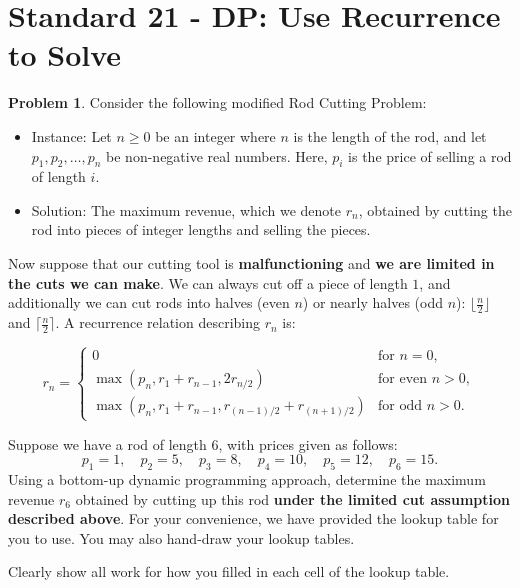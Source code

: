 \documentclass[11pt]{article}
\theoremstyle{definition}
\theoremstyle{definition}
\newtheorem{required}{Problem}
\theoremstyle{definition}
\begin{document}
\newpage
\section{Standard 21 - DP: Use Recurrence to Solve}

\begin{required} \label{Problem2}
Consider the following modified \textsf{Rod Cutting Problem}:  
\begin{itemize}
\item \textsf{Instance:} Let $n \geq 0$ be an integer where $n$ is the length of the rod, and let $p_{1}, p_{2}, \ldots, p_{n}$ be non-negative real numbers. Here, $p_{i}$ is the price of selling a rod of length $i$.
\item \textsf{Solution:} The maximum revenue, which we denote $r_{n}$, obtained by cutting the rod into pieces of integer lengths and selling the pieces.
\end{itemize}

\noindent Now suppose that our cutting tool is \textbf{malfunctioning} and \textbf{we are limited in the cuts we can make}.  We can always cut off a piece of length $1$, and additionally we can cut rods into halves (even $n$) or nearly halves (odd $n$): $\lfloor\frac{n}{2}\rfloor$ and $\lceil\frac{n}{2}\rceil$.  A recurrence relation describing $r_n$ is:

\[
r_{n} =
\begin{cases} 
	0 & \text{for } n=0,\\
	\max(p_n, r_1 + r_{n-1}, 2r_{n/2}) & \text{for even } n > 0, \\
        \max(p_n, r_1 + r_{n-1}, r_{(n-1)/2} + r_{(n+1)/2}) & \text{for odd } n > 0.
\end{cases}
\]

Suppose we have a rod of length $6$, with prices given as follows:
\[ p_{1} = 1, \quad p_{2} = 5, \quad p_{3} = 8, \quad p_{4} = 10, \quad p_{5} = 12, \quad p_{6} = 15. \] 
Using a bottom-up dynamic programming approach, determine the maximum revenue $r_{6}$ obtained by cutting up this rod \textbf{under the limited cut assumption described above}. For your convenience, we have provided the lookup table for you to use. You may also hand-draw your lookup tables. 

\noindent Clearly show all work for how you filled in each cell of the lookup table.

\end{required}
\end{document}
